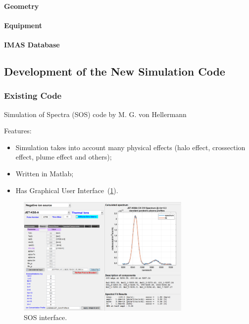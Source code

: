 \documentclass[../main.tex]{subfiles}
\begin{document}
\paragraph{Geometry}
\paragraph{Equipment}
\paragraph{IMAS Database}

\subsection{Development of the New Simulation Code}
\subsubsection{Existing Code}
Simulation of Spectra (SOS) code by M. G. von Hellermann~\cite{sos}

Features:
\begin{itemize}
    \item Simulation takes into account many physical effects (halo effect, crossection effect, plume effect and others);
    \item Written in Matlab;
    \item Has Graphical User Interface~(\cref{fig:sos_interface}).
\end{itemize}

\begin{figure}[ht]
    \centering
    \includegraphics[width=0.75\textwidth]{images/sos_interface}
    \caption{SOS interface.}%
    \label{fig:sos_interface}
\end{figure}
\end{document}
